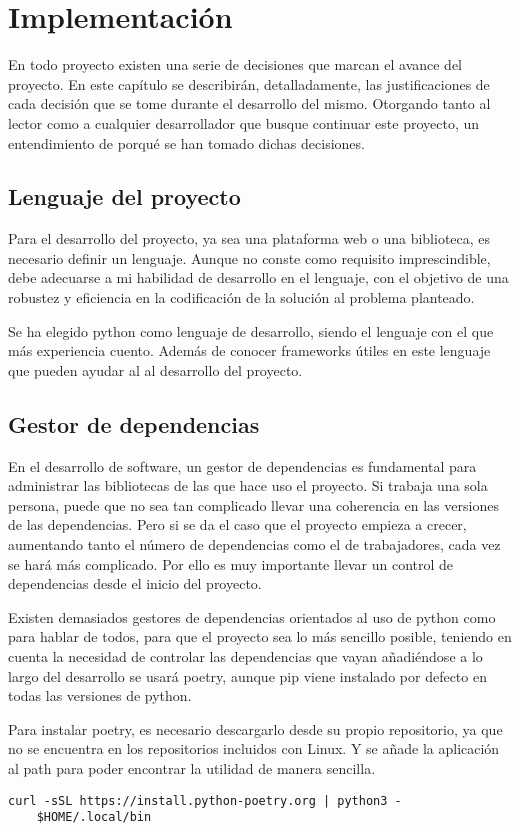\chapter{Implementación}
En todo proyecto existen una serie de decisiones que marcan el avance del proyecto. En este capítulo se describirán, detalladamente, las justificaciones de cada decisión que se tome durante el desarrollo del mismo. Otorgando tanto al lector como a cualquier desarrollador que busque continuar este proyecto, un entendimiento de porqué se han tomado dichas decisiones.

\section{Lenguaje del proyecto}
Para el desarrollo del proyecto, ya sea una plataforma web o una biblioteca, es necesario definir un lenguaje. Aunque no conste como requisito imprescindible, debe adecuarse a mi habilidad de desarrollo en el lenguaje, con el objetivo de una robustez y eficiencia en la codificación de la solución al problema planteado. 

Se ha elegido \Gls{python} como lenguaje de desarrollo, siendo el lenguaje con el que más experiencia cuento. Además de conocer frameworks útiles en este lenguaje que pueden ayudar al al desarrollo del proyecto.

\section{Gestor de dependencias}
En el desarrollo de software, un gestor de \glspl{dependencia} es fundamental para administrar las bibliotecas de las que hace uso el proyecto. Si trabaja una sola persona, puede que no sea tan complicado llevar una coherencia en las versiones de las \glspl{dependencia}. Pero si se da el caso que el proyecto empieza a crecer, aumentando tanto el número de \glspl{dependencia} como el de trabajadores, cada vez se hará más complicado. Por ello es muy importante llevar un control de \glspl{dependencia} desde el inicio del proyecto.

Existen demasiados gestores de \glspl{dependencia} orientados al uso de \Gls{python} como para hablar de todos, para que el proyecto sea lo más sencillo posible, teniendo en cuenta la necesidad de controlar las \glspl{dependencia} que vayan añadiéndose a lo largo del desarrollo se usará \Gls{poetry}, aunque \Gls{pip} viene instalado por defecto en todas las versiones de \Gls{python}. 

Para instalar \gls{poetry}, es necesario descargarlo desde su propio repositorio, ya que no se encuentra en los repositorios incluidos con Linux. Y se añade la aplicación al \gls{path} para poder encontrar la utilidad de manera sencilla.
\begin{lstlisting}[style=consola]
	curl -sSL https://install.python-poetry.org | python3 -
	$HOME/.local/bin
\end{lstlisting}

